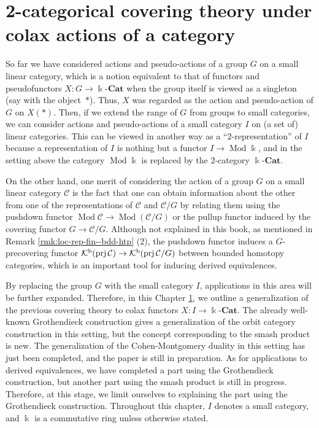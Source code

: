\documentclass{surv-l}
\numberwithin{equation}{chapter}
\numberwithin{figure}{chapter}
\theoremstyle{plain}
\theoremstyle{definition}
\theoremstyle{remark}
\newcommand{\kCat}{\Bbbk\text{-}\mathbf{Cat}}
\DeclareMathOperator{\Mod}{Mod}
\DeclareMathOperator{\prj}{prj}
\begin{document}


\chapter[2-categorical covering theory under colax actions]
{2-categorical covering theory under colax actions of a
  category}\label{ch:colax}\label{ch:8}
So far we have considered actions and pseudo-actions of a group
$G$ on a small linear category, which is a notion equivalent to that of
functors and pseudofunctors $X\colon G \to \kCat$ when the group itself
is viewed as a singleton (say with the object~$*$).
Thus, $X$ was regarded as the action and pseudo-action of $G$ on $X(*)$.
Then, if we extend the range of $G$ from groups to small categories,
we can consider actions and pseudo-actions of a small category $I$
on (a set of) linear categories.
This can be viewed in another way as a ``$2$-representation'' of $I$
because a representation of $I$ is nothing but a functor $I \to \Mod\Bbbk$,
and in the setting above the category $\Mod\Bbbk$ is replaced by the $2$-category $\kCat$.

On the other hand, one merit of considering the action of a group $G$ on a small linear category ${\mathcal{C}}$ is the fact
that one can obtain information about the other from one of the representations of ${\mathcal{C}}$ and ${\mathcal{C}}/G$ by relating them using the pushdown functor $\Mod {\mathcal{C}} \to \Mod ({\mathcal{C}}/G)$ or the pullup functor
induced by the covering functor $G \to {\mathcal{C}}/G$.
Although not explained in this book, as mentioned in Remark \ref{rmk:loc-rep-fin--bdd-htp} (2),
the pushdown functor induces a $G$-precovering functor ${\mathcal K}^{\text{\rm b}}(\prj{\mathcal{C}}) \to {\mathcal K}^{\text{\rm b}}(\prj {\mathcal{C}}/G)$
between bounded homotopy categories, which is an important tool for inducing
derived equivalences.

By replacing the group $G$ with the small category $I$, applications in this area will be further expanded.
Therefore, in this Chapter \ref{ch:colax}, we outline a generalization of the previous covering theory
to colax functors $X \colon I \to \kCat$.
The already well-known Grothendieck construction gives
a generalization of the orbit category construction in this setting,
but the concept corresponding to the smash product is new.
The generalization of the Cohen-Montgomery duality in this setting has just been completed,
and the paper is still in preparation.
As for applications to derived equivalences, we have completed a part using the Grothendieck construction,
but another part using the smash product is still in progress.
Therefore, at this stage, we limit ourselves to explaining the part using the Grothendieck construction.
Throughout this chapter, $I$ denotes a small category, and $\Bbbk$ is a commutative ring unless otherwise stated.
\end{document}
